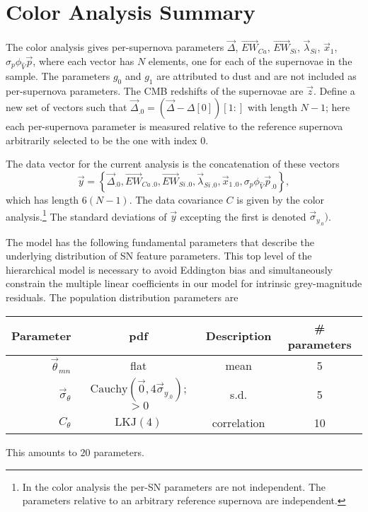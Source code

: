 \documentclass{aastex61}   	%
\begin{document}
\section{Color Analysis Summary}
The color analysis gives per-supernova parameters
$\vec{\Delta}$,  $\overrightarrow{EW}_{Ca}$,  $\overrightarrow{EW}_{Si}$,  $\vec{\lambda}_{Si}$,   $\vec{x}_1$,  $\sigma_p\phi_{\hat{V}}  \vec{p}$,
where each vector has $N$ elements, one for each of the supernovae in the sample.  The parameters $g_0$ and $g_1$ are attributed to dust
and are not included as per-supernova parameters.  The CMB redshifts of the supernovae are $\vec{z}$.  Define a new set of vectors such that
$\vec{\Delta}_{.0} = (\vec{\Delta} - \Delta[0])[1:]$ with length $N-1$; here each per-supernova parameter is measured relative to the
reference supernova arbitrarily selected to be the one with index 0.

The data vector for the current analysis is the concatenation of these vectors
\[
\vec{y} = \left\{\vec{\Delta}_{.0} , \overrightarrow{EW}_{Ca\,.0} ,  \overrightarrow{EW}_{Si\,.0},  \vec{\lambda}_{Si\,.0},   \vec{x}_{1\,.0},  \sigma_p\phi_{\hat{V}}  \vec{p}_{.0} \right\},
\]
which has length $6(N-1)$.  The data covariance $C$ is given by the color analysis.\footnote{In
the color analysis the per-SN parameters
are not independent.  The parameters relative to an arbitrary reference supernova are independent.}
The standard deviations of $\vec{y}$ excepting the first is denoted $\vec{\sigma}_{y_{.0}})$.

The model has the following fundamental parameters that describe the underlying distribution of SN feature parameters.
This top level of the hierarchical model is necessary to avoid Eddington bias and simultaneously constrain the multiple linear
coefficients in our model for intrinsic grey-magnitude residuals.
The population distribution parameters are
\begin{center}
\begin{tabular}{rccc}
\hline
Parameter & pdf & Description & \# parameters\\ \hline
$\vec{\theta}_{\mathit{mn}}$ & flat  &  mean & 5\\
$\vec{\sigma}_{\theta}$ & $\text{Cauchy}(\vec{0},4\vec{\sigma}_{y_{.0}})$; $>0$  &  s.d. & 5\\
$C_{\theta}$ & $\text{LKJ}(4)$ &  correlation & 10\\
\hline
\end{tabular}
\end{center}
This amounts to $20$ parameters.
\end{document}
